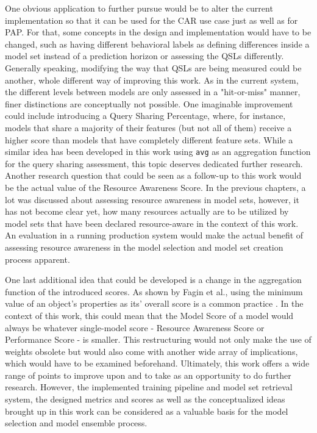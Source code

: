 One obvious application to further pursue would be to alter the current implementation so that it can be used for the CAR use case just as well as for PAP. For that, some concepts in the design and implementation would have to be changed, such as having different behavioral labels as defining differences inside a model set instead of a prediction horizon or assessing the QSLs differently. Generally speaking, modifying the way that QSLs are being measured could be another, whole different way of improving this work. As in the current system, the different levels between models are only assessed in a "hit-or-miss" manner, finer distinctions are conceptually not possible. One imaginable improvement could include introducing a Query Sharing Percentage, where, for instance, models that share a majority of their features (but not all of them) receive a higher score than models that have completely different feature sets. While a similar idea has been developed in this work using \texttt{avg} as an aggregation function for the query sharing assessment, this topic deserves dedicated further research. Another research question that could be seen as a follow-up to this work would be the actual value of the Resource Awareness Score. In the previous chapters, a lot was discussed about assessing resource awareness in model sets, however, it has not become clear yet, how many resources actually are to be utilized by model sets that have been declared resource-aware in the context of this work. An evaluation in a running production system would make the actual benefit of assessing resource awareness in the model selection and model set creation process apparent.

One last additional idea that could be developed is a change in the aggregation function of the introduced scores. As shown by Fagin et al., using the minimum value of an object's properties as its' overall score is a common practice \cite{fagin2002}. In the context of this work, this could mean that the Model Score of a model would always be whatever single-model score - Resource Awareness Score or Performance Score - is smaller. This restructuring would not only make the use of weights obsolete but would also come with another wide array of implications, which would have to be examined beforehand. Ultimately, this work offers a wide range of points to improve upon and to take as an opportunity to do further research. However, the implemented training pipeline and model set retrieval system, the designed metrics and scores as well as the conceptualized ideas brought up in this work can be considered as a valuable basis for the model selection and model ensemble process.



